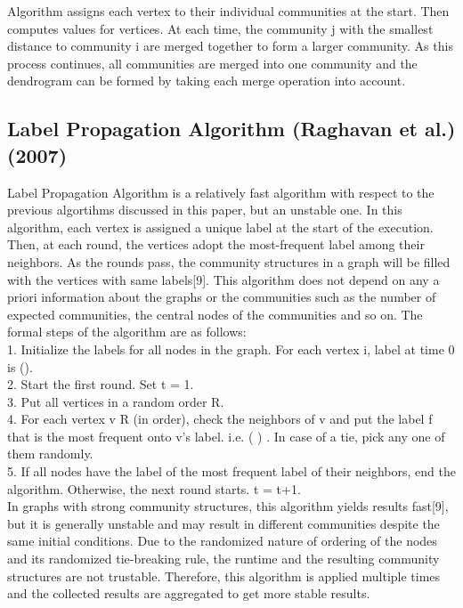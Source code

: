 \documentclass[10pt]{article}
\begin{document}
Algorithm assigns each vertex to their individual communities at the start. Then computes values for vertices. At each time, the community j with the smallest distance to community i are
merged together to form a larger community. As this process continues, all communities are merged into one community and the dendrogram can be formed by taking each merge operation into account. \\

\subsection{Label Propagation Algorithm (Raghavan et al.) (2007)} 

Label Propagation Algorithm is a relatively fast algorithm with respect to the previous algortihms discussed in this paper, but an unstable one. In this algorithm, each vertex is assigned a unique label at the start of the execution. Then, at each round, the vertices adopt the most-frequent label among their neighbors. As the rounds pass, the community structures in a graph will be filled with the vertices with same labels[9]. This algorithm does not depend on any a priori information about the graphs or the communities such as the number of expected communities, the central nodes of the communities and so on. The formal steps of the algorithm are as follows: \\

1. Initialize the labels for all nodes in the graph. For each vertex i, label at time 0 is (). \\
2. Start the first round. Set t = 1. \\
3. Put all vertices in a random order R. \\
4. For each vertex v R (in order), check the neighbors of v and put the label f that is the most frequent onto v’s label. i.e. ( ) . In case of a tie, pick any one of them
randomly. \\
5. If all nodes have the label of the most frequent label of their neighbors, end the algorithm. Otherwise, the next round starts. t = t+1. \\

In graphs with strong community structures, this algorithm yields results fast[9], but it is generally unstable and may result in different communities despite the same initial conditions. Due
to the randomized nature of ordering of the nodes and its randomized tie-breaking rule, the runtime and the resulting community structures are not trustable. Therefore, this algorithm is applied multiple times and the collected results are aggregated to get more stable results. \\
\end{document}
